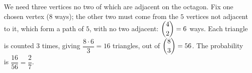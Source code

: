 We need three vertices no two of which are adjacent on the octagon. Fix one chosen vertex (8 ways); the other two must come from the $5$ vertices not adjacent to it, which form a path of $5$, with no two adjacent: $\dbinom42=6$ ways. Each triangle is counted $3$ times, giving $\dfrac{8\cdot6}{3}=16$ triangles, out of $\dbinom83=56$. The probability is $\dfrac{16}{56}=\boxed{\dfrac{2}{7}}$.
